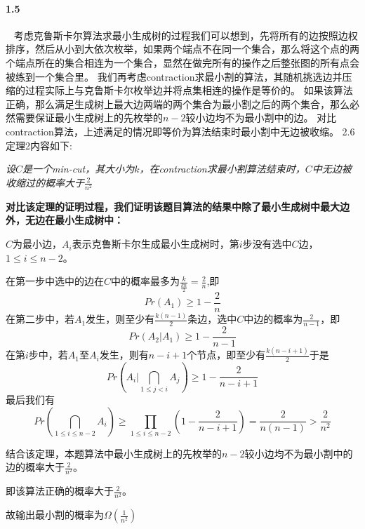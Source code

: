 \paragraph{1.5}~{}
考虑克鲁斯卡尔算法求最小生成树的过程我们可以想到，先将所有的边按照边权排序，然后从小到大依次枚举，如果两个端点不在同一个集合，那么将这个点的两个端点所在的集合相连为一个集合，显然在做完所有的操作之后整张图的所有点会被练到一个集合里。
我们再考虑contraction求最小割的算法，其随机挑选边并压缩的过程实际上与克鲁斯卡尔枚举边并将点集相连的操作是等价的。
如果该算法正确，那么满足生成树上最大边两端的两个集合为最小割之后的两个集合，那么必然需要保证最小生成树上的先枚举的$n-2$较小边均不为最小割中的边。
对比contraction算法，上述满足的情况即等价为算法结束时最小割中无边被收缩。
2.6定理2内容如下:

\quad \quad \emph{设$C$是一个min-cut，其大小为$k$，在contraction求最小割算法结束时，$C$中无边被收缩过的概率大于$\frac{2}{n^2}$}

\textbf{对比该定理的证明过程，我们证明该题目算法的结果中除了最小生成树中最大边外，无边在最小生成树中：}

$C$为最小边，$A_i$表示克鲁斯卡尔生成最小生成树时，第$i$步没有选中$C$边，$1 \le i \le n-2$。

在第一步中选中的边在$C$中的概率最多为$\frac{k}{\frac{kn}{2}}=\frac{2}{n}$,即
$$Pr(A_1) \ge 1-\frac{2}{n}$$
在第二步中，若$A_1$发生，则至少有$\frac{k(n-1)}{2}$条边，选中$C$中边的概率为$\frac{2}{n-1}$，即
$$Pr(A_2|A_1) \ge 1-\frac{2}{n-1}$$
在第$i$步中，若$A_1$至$A_i$发生，则有$n-i+1$个节点，即至少有$\frac{k(n-i+1)}{2}$于是
$$Pr(A_i|\bigcap_{1 \le j < i}A_j) \ge 1-\frac{2}{n-i+1}$$
最后我们有
$$Pr(\bigcap_{1 \le i \le n-2}A_i) \ge \prod_{1 \le i \le n-2}(1-\frac{2}{n-i+1})=\frac{2}{n(n-1)}>\frac{2}{n^2}$$

结合该定理，本题算法中最小生成树上的先枚举的$n-2$较小边均不为最小割中的边的概率大于$\frac{2}{n^2}$。

即该算法正确的概率大于$\frac{2}{n^2}$。

故输出最小割的概率为$\Omega(\frac{1}{n^2})$